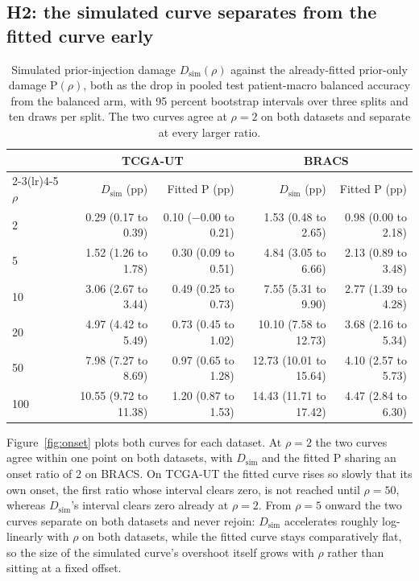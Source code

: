 \subsection{H2: the simulated curve separates from the fitted curve early}
\label{sec:h2-result}
\begin{table}[htbp]
\centering
\small
\setlength{\tabcolsep}{5pt}
\renewcommand{\arraystretch}{1.05}
\begin{tabular}{@{}lrrrr@{}}
\toprule
& \multicolumn{2}{c}{TCGA-UT} & \multicolumn{2}{c}{BRACS} \\
\cmidrule(lr){2-3}\cmidrule(lr){4-5}
$\rho$ & $D_{\mathrm{sim}}$ (pp) & Fitted P (pp) & $D_{\mathrm{sim}}$ (pp) & Fitted P (pp) \\
\midrule
2   & 0.29 \; (0.17 to 0.39)  & 0.10 \; ($-$0.00 to 0.21) & 1.53 \; (0.48 to 2.65)   & 0.98 \; (0.00 to 2.18) \\
5   & 1.52 \; (1.26 to 1.78)  & 0.30 \; (0.09 to 0.51)    & 4.84 \; (3.05 to 6.66)   & 2.13 \; (0.89 to 3.48) \\
10  & 3.06 \; (2.67 to 3.44)  & 0.49 \; (0.25 to 0.73)    & 7.55 \; (5.31 to 9.90)   & 2.77 \; (1.39 to 4.28) \\
20  & 4.97 \; (4.42 to 5.49)  & 0.73 \; (0.45 to 1.02)    & 10.10 \; (7.58 to 12.73) & 3.68 \; (2.16 to 5.34) \\
50  & 7.98 \; (7.27 to 8.69)  & 0.97 \; (0.65 to 1.28)    & 12.73 \; (10.01 to 15.64)& 4.10 \; (2.57 to 5.73) \\
100 & 10.55 \; (9.72 to 11.38)& 1.20 \; (0.87 to 1.53)    & 14.43 \; (11.71 to 17.42)& 4.47 \; (2.84 to 6.30) \\
\bottomrule
\end{tabular}
\caption{Simulated prior-injection damage $D_{\mathrm{sim}}(\rho)$ against the already-fitted prior-only damage P$(\rho)$, both as the drop in pooled test patient-macro balanced accuracy from the balanced arm, with 95 percent bootstrap intervals over three splits and ten draws per split. The two curves agree at $\rho=2$ on both datasets and separate at every larger ratio.}
\label{tab:h2}
\end{table}

\noindent Figure~\ref{fig:onset} plots both curves for each dataset. At $\rho=2$ the two curves agree within one point on both datasets, with $D_{\mathrm{sim}}$ and the fitted P sharing an onset ratio of 2 on BRACS. On TCGA-UT the fitted curve rises so slowly that its own onset, the first ratio whose interval clears zero, is not reached until $\rho=50$, whereas $D_{\mathrm{sim}}$'s interval clears zero already at $\rho=2$. From $\rho=5$ onward the two curves separate on both datasets and never rejoin: $D_{\mathrm{sim}}$ accelerates roughly log-linearly with $\rho$ on both datasets, while the fitted curve stays comparatively flat, so the size of the simulated curve's overshoot itself grows with $\rho$ rather than sitting at a fixed offset.

